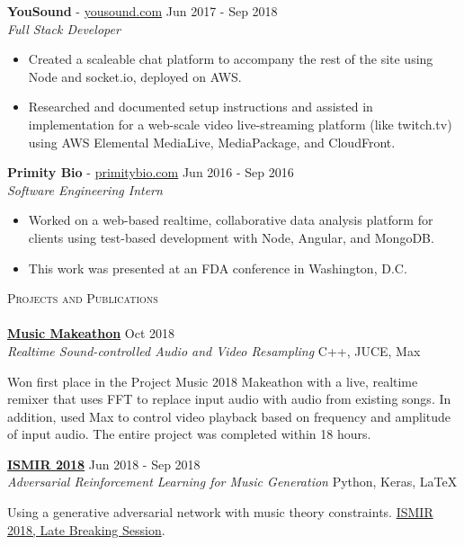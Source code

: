 \documentclass[11pt]{extarticle}
\newcommand{\lineunder} {
	\vspace*{-8pt} \\
	\hspace*{-18pt} \hrulefill \\
}
\newcommand{\header} [1] {
	{\hspace*{-18pt}\vspace*{6pt} \textsc{#1}}
	\vspace*{-6pt} \lineunder
}
\begin{document}
\noindent
\textbf{YouSound} - \url{yousound.com} \hfill Jun 2017 - Sep 2018\\
\textit{Full Stack Developer} \\
\vspace{-6mm}
\begin{itemize} \itemsep 0.1pt
	\item Created a scaleable chat platform to accompany the rest of the site using Node and socket.io, deployed on AWS.
	\item Researched and documented setup instructions and assisted in implementation for a web-scale video live-streaming platform (like twitch.tv) using AWS Elemental MediaLive, MediaPackage, and CloudFront.
\end{itemize}

\noindent
\textbf{Primity Bio} - \url{primitybio.com} \hfill Jun 2016 - Sep 2016\\
\textit{Software Engineering Intern} \\
\vspace{-6mm}
\begin{itemize} \itemsep 0.1pt
	\item Worked on a web-based realtime, collaborative data analysis platform for clients using test-based development with Node, Angular, and MongoDB.
	\item This work was presented at an FDA conference in Washington, D.C.
\end{itemize}

\newpage
\noindent
\header{Projects and Publications}
\noindent
\href{https://github.com/nacgarg/music-makeathon}{\textbf{Music Makeathon}} \hfill Oct 2018\\
\textit{Realtime Sound-controlled Audio and Video Resampling} \hfill C++, JUCE, Max \\
\vspace{-25pt}
\begin{paragraph}{}
	Won first place in the Project Music 2018 Makeathon with a live, realtime remixer that uses FFT to replace input audio with audio from existing songs. In addition, used Max to control video playback based on frequency and amplitude of input audio. The entire project was completed within 18 hours.\\
\end{paragraph}


\noindent
\href{http://ismir2018.ircam.fr/pages/events-lbd.html}{\textbf{ISMIR 2018}} \hfill Jun 2018 - Sep 2018\\
\textit{Adversarial Reinforcement Learning for Music Generation} \hfill Python, Keras, \LaTeX\\
\vspace{-25pt}
\begin{paragraph}{}
\begin{sloppypar}
Using a generative adversarial network with music theory constraints. \href{http://ismir2018.ircam.fr/pages/events-lbd.html}{ISMIR 2018, Late Breaking Session}.\\
\end{sloppypar}
\end{paragraph}
\end{document}
